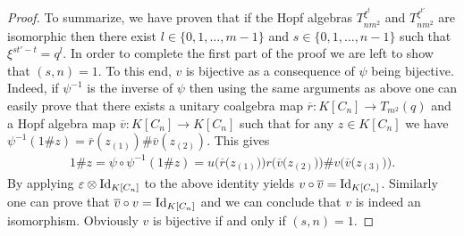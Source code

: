 \documentclass[11pt]{article}
\numberwithin{equation}{section}
\begin{document}
\begin{proof}
To summarize, we have proven that if the Hopf algebras $T_{nm^{2}}^ {\xi^{t}}$ and $T_{nm^{2}}^ {\xi^{t'}}$ are isomorphic then there exist $l \in \{ 0, 1,\dots, m-1 \}$ and $s \in \{ 0, 1,\dots, n-1 \}$ such that $\xi^{st' - t} = q^{l}$. In order to complete the first part of the proof we are left to show that $(s, n) = 1$. To this end, $v$ is bijective as a consequence of $\psi$ being bijective. Indeed, if $\psi^{-1}$ is the inverse of $\psi$ then using the same arguments as above one can easily prove that there exists a unitary coalgebra map $\overline{r}\colon K[C_{n}] \to T_{m^{2}}(q)$ and a Hopf algebra map $\overline{v}\colon K[C_{n}] \to K[C_{n}]$ such that for any $z \in K[C_{n}]$ we have $\psi^{-1} (1 \# z) = \overline{r}(z_{(1)}) \# \overline{v}(z_{(2)})$. This gives
\begin{gather*}
1 \# z = \psi \circ \psi^{-1} (1 \# z) = u \big(\overline{r}\big(z_{(1)}\big)\big) r \big(\overline{v}\big(z_{(2)}\big)\big) \# v\big(\overline{v}\big(z_{(3)}\big)\big).
\end{gather*}
By applying $\varepsilon \otimes {\rm Id}_{K[C_{n}]}$ to the above identity yields $v \circ \overline{v}= {\rm Id}_{K[C_{n}]}$. Similarly one can prove that $\overline{v} \circ v= {\rm Id}_{K[C_{n}]}$ and we can conclude that $v$ is indeed an isomorphism. Obviously $v$ is bijective if and only if $(s, n) = 1$.


\end{proof}
\end{document}
